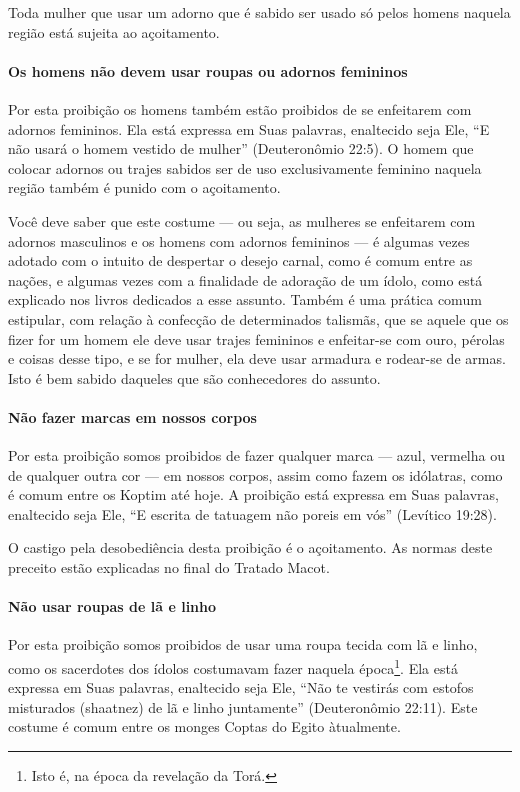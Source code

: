 Toda mulher que usar um adorno que é sabido ser usado só pelos homens
naquela região está sujeita ao açoitamento.

\paragraph{Os homens não devem usar roupas ou adornos femininos}

Por esta proibição os homens também estão proibidos de se enfeitarem
com adornos femininos. Ela está expressa em Suas palavras, enaltecido
seja Ele, ``E não usará o homem vestido de mulher'' (Deuteronômio
22:5). O homem que colocar adornos ou trajes sabidos ser de uso
exclusivamente feminino naquela região também é punido com o
açoitamento.

Você deve saber que este costume --- ou seja, as mulheres se enfeitarem
com adornos masculinos e os homens com adornos femininos --- é algumas
vezes adotado com o intuito de despertar o desejo carnal, como é comum
entre as nações, e algumas vezes com a finalidade de adoração de um
ídolo, como está explicado nos livros dedicados a esse assunto. Também é
uma prática comum estipular, com relação à confecção de determinados
talismãs, que se aquele que os fizer for um homem ele deve usar trajes
femininos e enfeitar-se com ouro, pérolas e coisas desse tipo, e se for
mulher, ela deve usar armadura e rodear-se de armas. Isto é bem sabido
daqueles que são conhecedores do assunto.

\paragraph{Não fazer marcas em nossos corpos}

Por esta proibição somos proibidos de fazer qualquer marca --- azul,
vermelha ou de qualquer outra cor --- em nossos corpos, assim como fazem
os idólatras, como é comum entre os Koptim até hoje. A proibição está
expressa em Suas palavras, enaltecido seja Ele, ``E escrita de tatuagem
não poreis em vós'' (Levítico 19:28).

O castigo pela desobediência desta proibição é o açoitamento. As normas
deste preceito estão explicadas no final do Tratado Macot.

\paragraph{Não usar roupas de lã e linho}

Por esta proibição somos proibidos de usar uma roupa tecida com lã e
linho, como os sacerdotes dos ídolos costumavam fazer naquela
época\footnote{Isto é, na época da revelação da Torá.}. Ela está expressa em Suas palavras,
enaltecido seja Ele, ``Não te vestirás com estofos misturados (shaatnez)
de lã e linho juntamente'' (Deuteronômio 22:11). Este costume é comum
entre os monges Coptas do Egito àtualmente.

